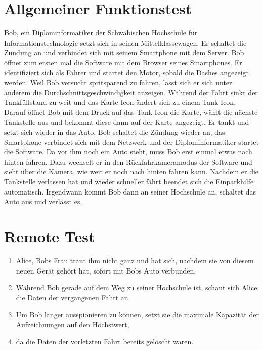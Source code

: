 \documentclass[pflichtenheft.tex]{subfiles}
\begin{document}
\section{Allgemeiner Funktionstest}
Bob, ein Diplominformatiker der Schwäbischen Hochschule für Informationstechnologie setzt sich in seinen Mittelklassewagen. Er schaltet die Zündung an und verbindet sich mit seinem Smartphone mit dem Server. Bob öffnet  zum ersten mal die Software mit dem Browser seines Smartphones. Er identifiziert sich als Fahrer und startet den Motor, sobald die Dashes angezeigt werden. Weil Bob versucht spritsparend zu fahren, lässt sich er sich unter anderem die Durchschnittsgeschwindigkeit anzeigen. Während der Fahrt sinkt der Tankfüllstand zu weit und das Karte-Icon ändert sich zu einem Tank-Icon. Darauf öffnet Bob mit dem Druck auf das Tank-Icon die Karte, wählt die nächste Tankstelle aus und bekommt diese dann auf der Karte angezeigt. Er tankt und setzt sich wieder in das Auto. Bob schaltet die Zündung wieder an, das Smartphone verbindet sich mit dem Netzwerk und der Diplominformatiker startet die Software. Da vor ihm noch ein Auto steht, muss Bob erst einmal etwas nach hinten fahren. Dazu wechselt er in den Rückfahrkameramodus der Software und sieht über die Kamera, wie weit er noch nach hinten fahren kann. Nachdem er die Tankstelle verlassen hat und wieder schneller fährt beendet sich die Einparkhilfe automatisch. Irgendwann kommt Bob dann an seiner Hochschule an, schaltet das Auto aus und verlässt es.

\section{Remote Test}
\begin{enumerate}
  \item Alice, Bobs Frau traut ihm nicht ganz und hat sich, nachdem sie von
  diesem neuen Gerät gehört hat, sofort mit Bobs Auto verbunden.
  \item  Während Bob gerade auf dem Weg zu seiner Hochschule ist, schaut sich
  Alice die Daten der vergangenen Fahrt an.
  \item Um Bob länger ausspionieren zu können, setzt sie die maximale Kapazität
  der Aufzeichnungen auf den Höchstwert,
  \item da die Daten der vorletzten Fahrt bereits gelöscht waren.
\end{enumerate}
  
\end{document}
